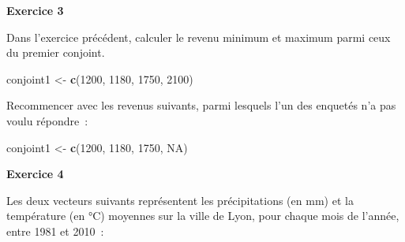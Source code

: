 \documentclass[12pt,]{book}
\newenvironment{Shaded}{\begin{snugshade}}{\end{snugshade}}
\newcommand{\DataTypeTok}[1]{\textcolor[rgb]{0.27,0.27,0.27}{#1}}
\newcommand{\DecValTok}[1]{\textcolor[rgb]{0.06,0.06,0.06}{#1}}
\newcommand{\KeywordTok}[1]{\textcolor[rgb]{0.27,0.27,0.27}{\textbf{#1}}}
\newcommand{\NormalTok}[1]{#1}
\newcommand{\OtherTok}[1]{\textcolor[rgb]{0.37,0.37,0.37}{#1}}
\newcommand{\StringTok}[1]{\textcolor[rgb]{0.5,0.5,0.5}{#1}}
\begin{document}
\textbf{Exercice 3}

Dans l'exercice précédent, calculer le revenu minimum et maximum parmi ceux du premier conjoint.

\begin{Shaded}
\begin{Highlighting}[]
\NormalTok{conjoint1 <-}\StringTok{ }\KeywordTok{c}\NormalTok{(}\DecValTok{1200}\NormalTok{, }\DecValTok{1180}\NormalTok{, }\DecValTok{1750}\NormalTok{, }\DecValTok{2100}\NormalTok{)}
\end{Highlighting}
\end{Shaded}

Recommencer avec les revenus suivants, parmi lesquels l'un des enquetés n'a pas voulu répondre~:

\begin{Shaded}
\begin{Highlighting}[]
\NormalTok{conjoint1 <-}\StringTok{ }\KeywordTok{c}\NormalTok{(}\DecValTok{1200}\NormalTok{, }\DecValTok{1180}\NormalTok{, }\DecValTok{1750}\NormalTok{, }\OtherTok{NA}\NormalTok{)}
\end{Highlighting}
\end{Shaded}

\textbf{Exercice 4}

Les deux vecteurs suivants représentent les précipitations (en mm) et la température (en °C) moyennes sur la ville de Lyon, pour chaque mois de l'année, entre 1981 et 2010~:
\end{document}
